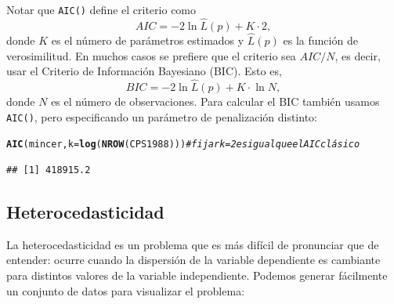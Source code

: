 \documentclass{article}\usepackage[]{graphicx}\usepackage[]{color}
\makeatletter
\newcommand{\hlcom}[1]{\textcolor[rgb]{0.678,0.584,0.686}{\textit{#1}}}%
\newcommand{\hlstd}[1]{\textcolor[rgb]{0.345,0.345,0.345}{#1}}%
\newcommand{\hlkwc}[1]{\textcolor[rgb]{0.333,0.667,0.333}{#1}}%
\newcommand{\hlkwd}[1]{\textcolor[rgb]{0.737,0.353,0.396}{\textbf{#1}}}%
\newenvironment{kframe}{%
 \def\at@end@of@kframe{}%
 \ifinner\ifhmode%
  \def\at@end@of@kframe{\end{minipage}}%
  \begin{minipage}{\columnwidth}%
 \fi\fi%
 \def\FrameCommand##1{\hskip\@totalleftmargin \hskip-\fboxsep
 \colorbox{shadecolor}{##1}\hskip-\fboxsep
     \hskip-\linewidth \hskip-\@totalleftmargin \hskip\columnwidth}%
 \MakeFramed {\advance\hsize-\width
   \@totalleftmargin\z@ \linewidth\hsize
   \@setminipage}}%
 {\par\unskip\endMakeFramed%
 \at@end@of@kframe}
\newenvironment{knitrout}{}{} %
\makeatother
\begin{document}
Notar que \verb|AIC()| define el criterio como
\begin{equation}
AIC = -2 \ln \widehat L(p) + K\cdot 2,
\end{equation}
donde $K$ es el número de parámetros estimados y $\widehat L(p)$ es la función de verosimilitud. En muchos casos se prefiere que el criterio sea $AIC/N$, es decir, usar el Criterio de Información Bayesiano (BIC). Esto es,
\begin{equation}
BIC = -2 \ln \widehat L(p) + K \cdot \ln N,
\end{equation}
donde $N$ es el número de observaciones.
Para calcular el BIC también usamos \verb|AIC()|, pero especificando un parámetro de penalización distinto:
\begin{knitrout}
\color{fgcolor}\begin{kframe}
\begin{alltt}
\hlkwd{AIC}\hlstd{(mincer,} \hlkwc{k} \hlstd{=} \hlkwd{log}\hlstd{(}\hlkwd{NROW}\hlstd{(CPS1988)))} \hlcom{# fijar k=2 es igual que el AIC clásico}
\end{alltt}
\begin{verbatim}
## [1] 418915.2
\end{verbatim}
\end{kframe}
\end{knitrout}


\subsection{Heterocedasticidad}

La heterocedasticidad es un problema que es más difícil de pronunciar que de entender: ocurre cuando la dispersión de la variable dependiente es cambiante para distintos valores de la variable independiente. Podemos generar fácilmente un conjunto de datos para visualizar el problema:
\end{document}
